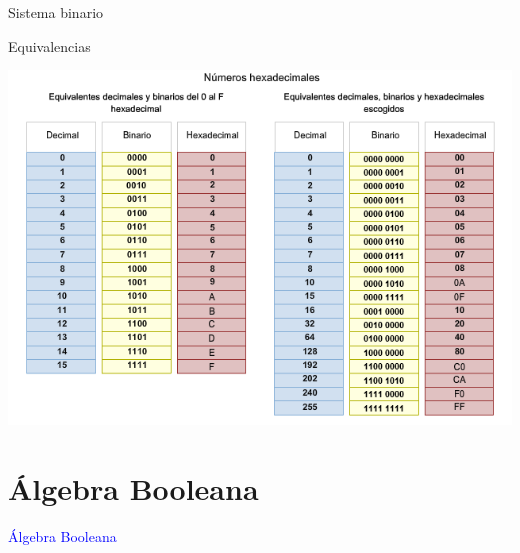\documentclass[10pt,xcolor={dvipsnames}]{beamer}
\begin{document}
\begin{frame}{Sistema binario}
\begin{center}
\end{center}
\end{frame}

\begin{frame}{Equivalencias}
\begin{center}
\includegraphics[scale=0.45]{Figures/2conteo}
\end{center}
\end{frame}

\section{Álgebra Booleana}

\begin{frame}
\begin{center}
\Huge{\textcolor{blue}{Álgebra Booleana}} \\ 
\end{center}
\end{frame}
\end{document}
